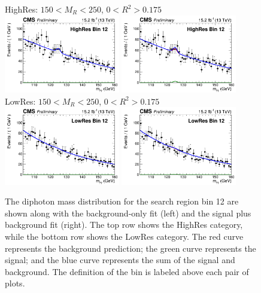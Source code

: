 \begin{figure}[ht!]
\centering
HighRes: $150 < M_{R} < 250$\GeV, $0 < R^{2}>0.175$\\
\includegraphics[width=0.45\textwidth, angle=0.]{figs/unblindedResults2p3Plus12p9/highResBin12_fit_b.png}
\includegraphics[width=0.45\textwidth, angle=0.]{figs/unblindedResults2p3Plus12p9/highResBin12_fit_s.png}\\
LowRes: $150 < M_{R} < 250$\GeV, $0 < R^{2}>0.175$\\
\includegraphics[width=0.45\textwidth, angle=0.]{figs/unblindedResults2p3Plus12p9/lowResBin12_fit_b.png}
\includegraphics[width=0.45\textwidth, angle=0.]{figs/unblindedResults2p3Plus12p9/lowResBin12_fit_s.png}\\
\caption{ The diphoton mass distribution for the search region bin 12 
are shown along with the background-only fit (left) and the signal plus background fit (right).
The top row shows the HighRes category, while the bottom row shows the LowRes category.
The red curve represents the background prediction; the green curve represents the signal; 
and the blue curve represents the sum of the signal and background. The definition of the bin
is labeled above each pair of plots.
\label{fig:UnblindedResultsBin12}}
\end{figure}

